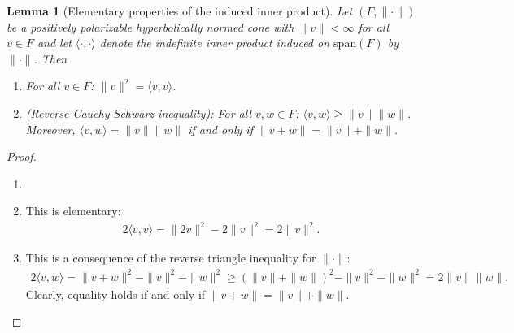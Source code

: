 \documentclass[a4paper,11pt]{article}
\numberwithin{equation}{section}
\theoremstyle{definition}
\theoremstyle{plain}
\newtheorem{Lemma}[Definition]{Lemma}
\newcommand{\spn}{\mathrm{span}}
\newcommand{\norm}[1]{\| #1\|}
\begin{document}

\begin{Lemma}[Elementary properties of the induced inner product]\label{Lemma: inner product properties}
Let $(F,\|\cdot\|)$ be a positively polarizable hyperbolically normed cone with $\|v\| < \infty$ for all $v \in F$ and let $\langle \cdot,\cdot \rangle$ denote the indefinite inner product induced on $\spn(F)$ by $\|\cdot\|$. Then
\begin{enumerate}
    \item[(i)] For all $v \in F$: $\|v\|^2 = \langle v,v\rangle$.
    \item[(ii)] (Reverse Cauchy-Schwarz inequality): For all $v,w \in F$: $\langle v,w\rangle \geq \|v\| \|w\|$. Moreover, $\langle v,w\rangle = \|v\| \|w\|$ if and only if $\|v + w\| = \|v\| + \|w\|$.
\end{enumerate}
\end{Lemma}
\begin{proof}
    \begin{enumerate}
        \item[]
        \item[(i)] This is elementary:
        \begin{align*}
            2\langle v,v\rangle = \|2v\|^2 - 2\|v\|^2 = 2 \|v\|^2.
        \end{align*}
        \item[(ii)] This is a consequence of the reverse triangle inequality for $\|\cdot\|$:
        \begin{align*}
            2\langle v,w\rangle = \|v + w\|^2 - \|v\|^2 - \|w\|^2 \geq (\|v\| + \|w\|)^2 - \|v\|^2 - \|w\|^2 = 2 \|v\| \|w\|.
        \end{align*}
        Clearly, equality holds if and only if $\|v + w\| = \|v\| + \|w\|$.
    \end{enumerate}
\end{proof}
\end{document}
